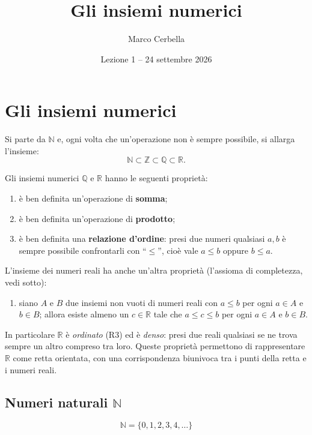\documentclass[11pt,a4paper]{article}
\title{Gli insiemi numerici}
\author{Marco Cerbella}
\date{Lezione 1 -- 24 settembre 2026}
\begin{document}
\maketitle

\section{Gli insiemi numerici}

Si parte da $\mathbb{N}$ e, ogni volta che un'operazione non è sempre
possibile, si allarga l'insieme:
\[
\mathbb{N} \subset \mathbb{Z} \subset \mathbb{Q} \subset \mathbb{R}.
\]

Gli insiemi numerici $\mathbb{Q}$ e $\mathbb{R}$ hanno le seguenti proprietà:
\begin{enumerate}
    \item[(R1)] è ben definita un'operazione di \textbf{somma};
    \item[(R2)] è ben definita un'operazione di \textbf{prodotto};
    \item[(R3)] è ben definita una \textbf{relazione d'ordine}: presi due numeri qualsiasi $a, b$ è sempre possibile confrontarli con ``$\leq$'', cioè vale $a \leq b$ oppure $b \leq a$.
\end{enumerate}
L'insieme dei numeri reali ha anche un'altra proprietà (l'assioma di completezza, vedi sotto):
\begin{enumerate}
    \item[(R4)] siano $A$ e $B$ due insiemi non vuoti di numeri reali con $a \leq b$ per ogni $a \in A$ e $b \in B$; allora esiste almeno un $c \in \mathbb{R}$ tale che $a \leq c \leq b$ per ogni $a \in A$ e $b \in B$.
\end{enumerate}
In particolare $\mathbb{R}$ è \emph{ordinato} (R3) ed è \emph{denso}: presi due reali qualsiasi se ne trova sempre un altro compreso tra loro. Queste proprietà permettono di rappresentare $\mathbb{R}$ come retta orientata, con una corrispondenza biunivoca tra i punti della retta e i numeri reali.

\subsection{Numeri naturali $\mathbb{N}$}

\[
\mathbb{N} = \{0, 1, 2, 3, 4, \dots\}
\]
\end{document}
